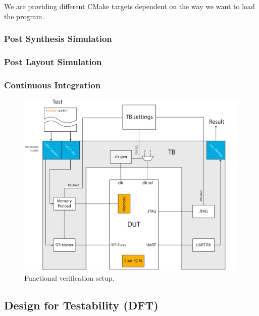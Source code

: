 We are providing different CMake targets dependent on the way we want to load the program. 

\subsubsection{Post Synthesis Simulation}


\subsubsection{Post Layout Simulation}

\subsubsection{Continuous Integration}
\begin{figure}[tb]
  \centering
  \includegraphics[width=\linewidth]{./figures/test_environment}
  \caption{Functional verification setup.}
  \label{fig:func_ver}
\end{figure}

\subsection{Design for Testability (DFT)}

